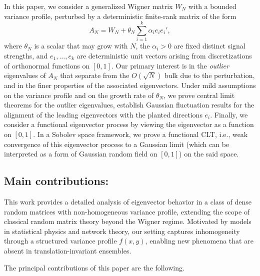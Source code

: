 \documentclass[11pt, reqno]{amsart}
\numberwithin{equation}{section}
\begin{document}
In this paper, we consider a generalized Wigner matrix $W_N$ with a bounded variance profile, perturbed by a deterministic finite-rank matrix of the form
\[
  A_N = W_N + \theta_N \sum_{i=1}^k \alpha_i e_i e_i',
\]
where $\theta_N$ is a scalar that may grow with $N$, the $\alpha_i>0$ are fixed distinct signal strengths, and $e_1,\dots,e_k$ are deterministic unit vectors arising from discretizations of orthonormal functions on $[0,1]$. Our primary interest is in the \emph{outlier} eigenvalues of $A_N$ that separate from the $O(\sqrt{N})$ bulk due to the perturbation, and in the finer properties of the associated eigenvectors. Under mild assumptions on the variance profile and on the growth rate of $\theta_N$, we prove central limit theorems for the outlier eigenvalues, establish Gaussian fluctuation results for the alignment of the leading eigenvectors with the planted directions $e_i$.  Finally, we consider a functional eigenvector process by viewing the eigenvector as a function on $[0,1]$. In a Sobolev space framework, we prove a functional CLT, i.e., weak convergence of this eigenvector process to a Gaussian limit (which can be interpreted as a form of Gaussian random field on $[0,1]$) on the said space.



\subsection*{ Main contributions:}


This work provides a detailed analysis of eigenvector behavior in a class of dense random matrices with non-homogeneous variance profile, extending the scope of classical random matrix theory beyond the Wigner regime. Motivated by models in statistical physics and network theory, our setting captures inhomogeneity through a structured variance profile $f(x,y)$, enabling new phenomena that are absent in translation-invariant ensembles.

The principal contributions of this paper are the following.
\end{document}
